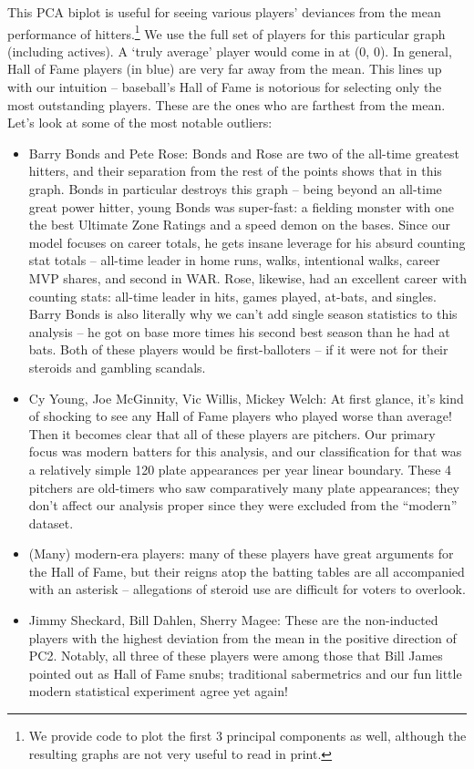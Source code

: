 \documentclass[letterpaper, 10 pt, conference]{ieeeconf}
\begin{document}
This PCA biplot is useful for seeing various players’ deviances from the mean performance of hitters.\footnote{We provide code to plot the first 3 principal components as well, although the resulting graphs are not very useful to read in print.} We use the full set of players for this particular graph (including actives). A ‘truly average’ player would come in at (0, 0). In general, Hall of Fame players (in blue) are very far away from the mean. This lines up with our intuition – baseball’s Hall of Fame is notorious for selecting only the most outstanding players. These are the ones who are farthest from the mean. Let’s look at some of the most notable outliers:

\begin{itemize}
\item Barry Bonds and Pete Rose: Bonds and Rose are two of the all-time greatest hitters, and their separation from the rest of the points shows that in this graph. Bonds in particular destroys this graph – being beyond an all-time great power hitter, young Bonds was super-fast: a fielding monster with one the best Ultimate Zone Ratings and a speed demon on the bases. Since our model focuses on career totals, he gets insane leverage for his absurd counting stat totals – all-time leader in home runs, walks, intentional walks, career MVP shares, and second in WAR. Rose, likewise, had an excellent career with counting stats: all-time leader in hits, games played, at-bats, and singles. Barry Bonds is also literally why we can’t add single season statistics to this analysis – he got on base more times his second best season than he had at bats. Both of these players would be first-balloters – if it were not for their steroids and gambling scandals. 
\item Cy Young, Joe McGinnity, Vic Willis, Mickey Welch: At first glance, it’s kind of shocking to see any Hall of Fame players who played worse than average! Then it becomes clear that all of these players are pitchers. Our primary focus was modern batters for this analysis, and our classification for that was a relatively simple 120 plate appearances per year linear boundary. These 4 pitchers are old-timers who saw comparatively many plate appearances; they don’t affect our analysis proper since they were excluded from the “modern” dataset.
\item (Many) modern-era players: many of these players have great arguments for the Hall of Fame, but their reigns atop the batting tables are all accompanied with an asterisk -- allegations of steroid use are difficult for voters to overlook. 
\item Jimmy Sheckard, Bill Dahlen, Sherry Magee: These are the non-inducted players with the highest deviation from the mean in the positive direction of PC2. Notably, all three of these players were among those that Bill James pointed out as Hall of Fame snubs; traditional sabermetrics and our fun little modern statistical experiment agree yet again!
\end{itemize}
\end{document}
